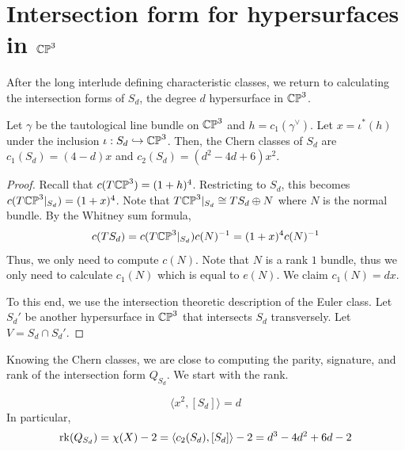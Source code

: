 \documentclass[12pt]{article}
\begin{document}
\section{Intersection form for hypersurfaces in $\mathbb{CP}^3$}
After the long interlude defining characteristic classes, we return to calculating the intersection forms of $S_d$, the degree $d$ hypersurface in $\mathbb{CP}^3$. 

\begin{lemma}
    Let $\gamma$ be the tautological line bundle on $\mathbb{CP}^3$ and $h = c_1(\gamma^\vee)$. Let $x = \iota^*(h)$ under the inclusion $\iota: S_d \hookrightarrow \mathbb{CP}^3$. Then, the Chern classes of $S_d$ are $c_1(S_d) = (4-d)x$ and $c_2(S_d) = (d^2-4d+6)x^2$. 
\end{lemma}
\begin{proof}
    Recall that $c(T\mathbb{CP}^3) = (1+h)^4$. Restricting to $S_d$, this becomes $c(T\mathbb{CP}^3|_{S_d}) = (1+x)^4$. Note that $T\mathbb{CP}^3|_{S_d} \cong TS_d \oplus N$ where $N$ is the normal bundle. By the Whitney sum formula, 
    \[ c(TS_d) = c(T\mathbb{CP}^3|_{S_d})c(N)^{-1} = (1+x)^4c(N)^{-1}\]
    Thus, we only need to compute $c(N)$. Note that $N$ is a rank $1$ bundle, thus we only need to calculate $c_1(N)$ which is equal to $e(N)$. We claim $c_1(N) = dx$. 

    To this end, we use the intersection theoretic description of the Euler class. Let $S_{d}'$ be another hypersurface in $\mathbb{CP}^3$ that intersects $S_d$ transversely. Let $V = S_d \cap S_d'$.   

\end{proof}

Knowing the Chern classes, we are close to computing the parity, signature, and rank of the intersection form $Q_{S_d}$. We start with the rank. 
\begin{lemma}
    \[ \langle x^2,[S_d]\rangle = d \]
    In particular,
    \[  \operatorname{rk}(Q_{S_d}) = \chi(X) - 2 = \langle c_2(S_d), [S_d] \rangle - 2 = d^3-4d^2+6d-2\]
\end{lemma}
\end{document}

